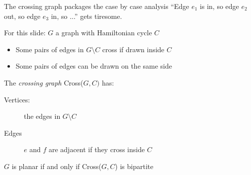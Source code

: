 \documentclass{beamer}
\begin{document}
\begin{frame}{The crossing graph packages the case by case analysis}
``Edge $e_1$ is in, so edge $e_2$ out, so edge $e_3$ in, so ...'' gets tiresome.

  \begin{block}{For this slide: $G$ a graph with Hamiltonian cycle $C$}
    \begin{itemize}
    \item Some pairs of edges in $G\setminus C$ cross if drawn inside $C$
    \item Some pairs of edges can be drawn on the same side
\end{itemize}
\end{block}
\begin{definition}
  The \emph{crossing graph} Cross($G, C)$ has:
  \begin{description}
  \item[Vertices:] the edges in $G\setminus C$
  \item[Edges] $e$ and $f$ are adjacent if they cross inside $C$
  \end{description}
  \end{definition}
\begin{theorem}
$G$ is planar if and only if Cross($G,C$) is bipartite
\end{theorem}

\end{frame}
\end{document}
